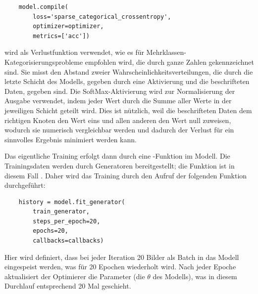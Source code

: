 \begin{lstlisting}
    model.compile(
        loss='sparse_categorical_crossentropy', 
        optimizer=optimizer,
        metrics=['acc'])
\end{lstlisting}

 wird als Verlustfunktion verwendet, wie es für Mehrklassen-Kategorisierungsprobleme empfohlen wird, die durch ganze Zahlen \cite[S.84]{Chollet2017} gekennzeichnet sind.
Sie misst den Abstand zweier Wahrscheinlichkeitsverteilungen, die durch die letzte Schicht des Modells, gegeben durch eine  Aktivierung und die beschrifteten Daten, gegeben sind.
Die SoftMax-Aktivierung wird zur Normalisierung der Ausgabe verwendet, indem jeder Wert durch die Summe aller Werte in der jeweiligen Schicht geteilt wird.
Dies ist nützlich, weil die beschrifteten Daten dem richtigen Knoten den Wert eins und allen anderen den Wert null zuweisen, wodurch sie numerisch vergleichbar werden und dadurch der Verlust für ein sinnvolles Ergebnis minimiert werden kann.

Das eigentliche Training erfolgt dann durch eine -Funktion im Modell.
Die Trainingsdaten werden durch Generatoren bereitgestellt; die Funktion ist in diesem Fall .
Daher wird das Training durch den Aufruf der folgenden Funktion durchgeführt:

\begin{lstlisting}
    history = model.fit_generator(
        train_generator,
        steps_per_epoch=20,
        epochs=20,
        callbacks=callbacks)
\end{lstlisting}

Hier wird definiert, dass bei jeder Iteration 20 Bilder als Batch in das Modell eingespeist werden, was für 20 Epochen wiederholt wird.
Nach jeder Epoche aktualisiert der Optimierer die Parameter (die $\theta$ des Modells), was in diesem Durchlauf entsprechend 20 Mal geschieht.

